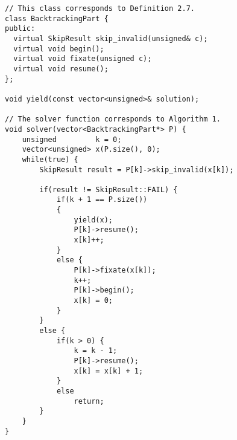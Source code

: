 \begin{lstlisting}[language=MyCpp,
                   label={cppsolver},caption=
  {Complete C++ implementation of \Cref{backtrackalg}:
    The if-else statements in lines 19--41 precisely correspond to those
    in lines 5--17 of that algorithm.
    The \texttt{BacktrackingPart} objects iterate over $\protect{B_k[C](M,x)}$ via the
    \texttt{skip\_invalid} method.
    The remaining member function calls in lines
    $\text{23},\text{27},\text{29},\text{36}$ precompute structures that are
    used in \texttt{skip\_invalid} for quick evaluation.}]
// This class corresponds to Definition 2.7.
class BacktrackingPart {
public:
  virtual SkipResult skip_invalid(unsigned& c);
  virtual void begin();
  virtual void fixate(unsigned c);
  virtual void resume();
};

void yield(const vector<unsigned>& solution);

// The solver function corresponds to Algorithm 1.
void solver(vector<BacktrackingPart*> P) {
    unsigned         k = 0;
    vector<unsigned> x(P.size(), 0);
    while(true) {
        SkipResult result = P[k]->skip_invalid(x[k]);

        if(result != SkipResult::FAIL) {
            if(k + 1 == P.size())
            {
                yield(x);
                P[k]->resume();
                x[k]++;
            }
            else {
                P[k]->fixate(x[k]);
                k++;
                P[k]->begin();
                x[k] = 0;
            }
        }
        else {
            if(k > 0) {
                k = k - 1;
                P[k]->resume();
                x[k] = x[k] + 1;
            }
            else
                return;
        }
    }
}
\end{lstlisting}
